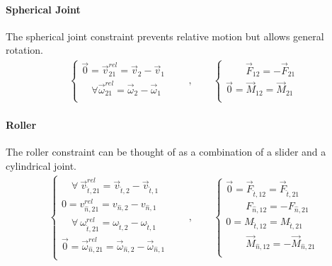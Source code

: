 \documentclass[letterpaper,10pt,english]{jupyterBook}
\begin{document}
\paragraph{Spherical Joint}
\label{\detokenize{ch/actions-reactions:spherical-joint}}
\sphinxAtStartPar
The spherical joint constraint prevents relative motion but allows general rotation.
\begin{equation*}
\begin{split}
\begin{cases}
  \vec{0} = \vec{v}^{rel}_{21}     = \vec{v}_{2}     - \vec{v}_{1} \\
  \quad \forall \vec{\omega}^{rel}_{21} = \vec{\omega}_{2} - \vec{\omega}_{1} \\
\end{cases}
\qquad , \qquad
\begin{cases}
  \qquad \vec{F}_{12} = - \vec{F}_{21} \\
  \vec{0} =  \vec{M}_{12} = \vec{M}_{21} \\
\end{cases}
\end{split}
\end{equation*}

\paragraph{Roller}
\label{\detokenize{ch/actions-reactions:roller}}
\sphinxAtStartPar
The roller constraint can be thought of as a combination of a slider and a cylindrical joint.
\begin{equation*}
\begin{split}
\begin{cases}
  \quad \forall \ \vec{v}^{rel}_{\hat{t},21}     = \vec{v}_{\hat{t},2}     - \vec{v}_{\hat{t},1} \\
          0  = v^{rel}_{\hat{n},21}     = v_{\hat{n},2}     - v_{\hat{n},1} \\
  \quad \forall \ \omega^{rel}_{\hat{t},21} = \omega_{\hat{t},2} - \omega_{\hat{t},1} \\
  \vec{0} = \vec{\omega}^{rel}_{\hat{n},21} = \vec{\omega}_{\hat{n},2} - \vec{\omega}_{\hat{n},1} \\
\end{cases}
\qquad , \qquad
\begin{cases}
  \vec{0} = \vec{F}_{\hat{t},12} = \vec{F}_{\hat{t},21} \\
  \qquad F_{\hat{n},12} = - F_{\hat{n},21} \\
  0 =  M_{\hat{t},12} = M_{\hat{t},21} \\
  \qquad \vec{M}_{\hat{n},12} = - \vec{M}_{\hat{n},21} \\
\end{cases}
\end{split}
\end{equation*}
\end{document}
